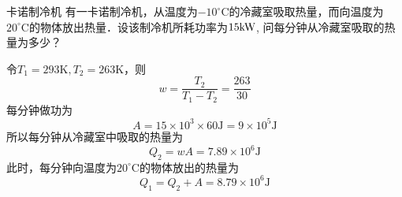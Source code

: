 \begin{example}{卡诺制冷机}
有一卡诺制冷机，从温度为$-10^{\circ} \mathrm{C}$的冷藏室吸取热量，而向温度为$20^{\circ} \mathrm{C}$的物体放出热量．设该制冷机所耗功率为$15\rm kW$, 问每分钟从冷藏室吸取的热量为多少？

令$T_1 = 293 \mathrm K , T_2 = 263 \mathrm K $，则
\begin{equation}
w=\frac{T_{2}}{T_{1}-T_{2}}=\frac{263}{30}
\end{equation}
每分钟做功为
\begin{equation}
A=15 \times 10^{3} \times 60 \mathrm{J}=9 \times 10^{5} \mathrm{J}
\end{equation}
所以每分钟从冷藏室中吸取的热量为
\begin{equation}
Q_{2}=w A=7.89 \times 10^{6} \mathrm{J}
\end{equation}
此时，每分钟向温度为$20^{\circ} \mathrm{C}$的物体放出的热量为
\begin{equation}
Q_{1}=Q_{2}+A=8.79 \times 10^{6} \mathrm{J}
\end{equation}

\end{example}